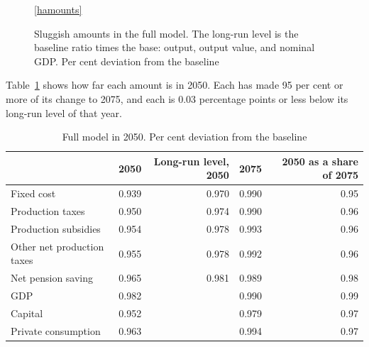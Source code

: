 \documentclass[11pt,a4paper]{article}
\begin{document}
\begin{figure}[H]
\centering
{}

\ref{hamounts}
\caption{Sluggish amounts in the full model. The long-run level is the baseline ratio times the base: output, output value, and nominal GDP. Per cent deviation from the baseline}
\label{fig:amounts}
\end{figure}

Table~\ref{tab:2050} shows how far each amount is in 2050. Each has made 95 per cent or more of its change to 2075, and each is 0.03 percentage points or less below its long-run level of that year.

\begin{table}[H]
\centering
\small
\caption{Full model in 2050. Per cent deviation from the baseline}
\label{tab:2050}
\begin{tabular}{@{}lrrrr@{}}
\toprule
 & 2050 & Long-run level, 2050 & 2075 & 2050 as a share of 2075 \\
\midrule
Fixed cost & 0.939 & 0.970 & 0.990 & 0.95 \\
Production taxes & 0.950 & 0.974 & 0.990 & 0.96 \\
Production subsidies & 0.954 & 0.978 & 0.993 & 0.96 \\
Other net production taxes & 0.955 & 0.978 & 0.992 & 0.96 \\
Net pension saving & 0.965 & 0.981 & 0.989 & 0.98 \\
\midrule
GDP & 0.982 & & 0.990 & 0.99 \\
Capital & 0.952 & & 0.979 & 0.97 \\
Private consumption & 0.963 & & 0.994 & 0.97 \\
\bottomrule
\end{tabular}
\end{table}
\end{document}

